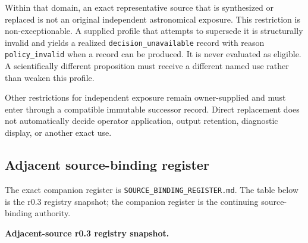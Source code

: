 Within that domain, an exact representative source that is synthesized or
replaced is not an original independent astronomical exposure. This
restriction is non-exceptionable. A supplied profile that attempts to
supersede it is structurally invalid and yields a realized
\texttt{decision\_unavailable} record with reason
\texttt{policy\_invalid} when a record can be produced. It is never evaluated
as eligible. A scientifically different proposition must receive a different
named use rather than weaken this profile.

Other restrictions for independent exposure remain owner-supplied and must
enter through a compatible immutable successor record. Direct replacement
does not automatically decide operator application, output retention,
diagnostic display, or another exact use.

\subsection{Adjacent source-binding register}
\label{sec:source-register}

The exact companion register is \nolinkurl{SOURCE_BINDING_REGISTER.md}. The
table below is the r0.3 registry snapshot; the companion register is the
continuing source-binding authority.

\textbf{Adjacent-source r0.3 registry snapshot.}

